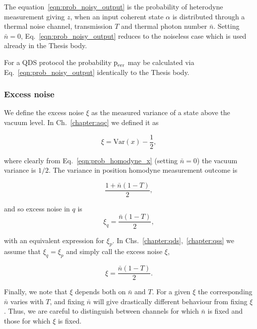 The equation~\ref{eqn:prob_noisy_output} is the probability of heterodyne measurement giving $z$, when an input coherent state $\alpha$ is distributed through a thermal noise channel, transmission $T$ and thermal photon number $\bar{n}$. Setting $\bar{n}=0$, Eq.~\ref{eqn:prob_noisy_output} reduces to the noiseless case which is used already in the Thesis body. 

For a QDS protocol the probability $\text{p}_{\text{err}}$ may be calculated via Eq.~\ref{eqn:prob_noisy_output} identically to the Thesis body.

\subsubsection{Excess noise}

We define the excess noise $\xi$ as the measured variance of a state above the vacuum level. In Ch.~\ref{chapter:aqc} we defined it as

\begin{equation}
\xi = \text{Var}\left(x\right) - \frac{1}{2},
\end{equation}

\noindent where clearly from Eq.~\ref{eqn:prob_homodyne_x} (setting $\bar{n}=0$) the vacuum variance is $1/2$. The variance in position homodyne measurement outcome is

\begin{equation}
\frac{1 + \bar{n}\left(1-T\right)}{2},
\end{equation}

\noindent and so excess noise in $q$ is
\begin{equation}
\xi_q = \frac{\bar{n}\left(1-T\right)}{2},
\end{equation}

\noindent with an equivalent expression for $\xi_p$. In Chs.~\ref{chapter:qds},~\ref{chapter:qss} we assume that $\xi_q = \xi_p$ and simply call the excess noise $\xi$,

\begin{equation}\label{eqn:excess_noise}
\xi = \frac{\bar{n}\left(1-T\right)}{2}.
\end{equation}

\noindent Finally, we note that $\xi$ depends both on $\bar{n}$ and $T$. For a given $\xi$ the corresponding $\bar{n}$ varies with $T$, and fixing $\bar{n}$ will give drastically different behaviour from fixing $\xi$. Thus, we are careful to distinguish between channels for which $\bar{n}$ is fixed and those for which $\xi$ is fixed.